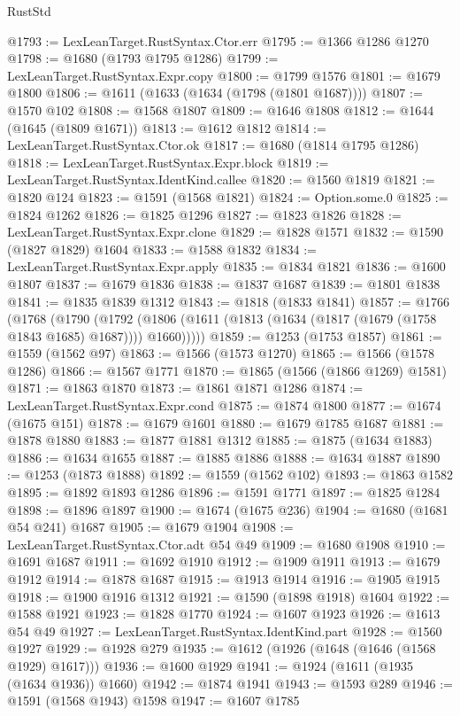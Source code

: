 \begin{lexlean}{RustStd}
\begin{coremodule}
@1793 := LexLeanTarget.RustSyntax.Ctor.err
@1795 := @1366 @1286 @1270
@1798 := @1680 (@1793 @1795 @1286)
@1799 := LexLeanTarget.RustSyntax.Expr.copy
@1800 := @1799 @1576
@1801 := @1679 @1800
@1806 := @1611 (@1633 (@1634 (@1798 (@1801 @1687))))
@1807 := @1570 @102
@1808 := @1568 @1807
@1809 := @1646 @1808
@1812 := @1644 (@1645 (@1809 @1671))
@1813 := @1612 @1812
@1814 := LexLeanTarget.RustSyntax.Ctor.ok
@1817 := @1680 (@1814 @1795 @1286)
@1818 := LexLeanTarget.RustSyntax.Expr.block
@1819 := LexLeanTarget.RustSyntax.IdentKind.callee
@1820 := @1560 @1819
@1821 := @1820 @124
@1823 := @1591 (@1568 @1821)
@1824 := Option.some.{0}
@1825 := @1824 @1262
@1826 := @1825 @1296
@1827 := @1823 @1826
@1828 := LexLeanTarget.RustSyntax.Expr.clone
@1829 := @1828 @1571
@1832 := @1590 (@1827 @1829) @1604
@1833 := @1588 @1832
@1834 := LexLeanTarget.RustSyntax.Expr.apply
@1835 := @1834 @1821
@1836 := @1600 @1807
@1837 := @1679 @1836
@1838 := @1837 @1687
@1839 := @1801 @1838
@1841 := @1835 @1839 @1312
@1843 := @1818 (@1833 @1841)
@1857 := @1766
    (@1768
      (@1790
        (@1792 (@1806 (@1611 (@1813 (@1634 (@1817 (@1679 (@1758 @1843 @1685) @1687)))) @1660)))))
@1859 := @1253 (@1753 @1857)
@1861 := @1559 (@1562 @97)
@1863 := @1566 (@1573 @1270)
@1865 := @1566 (@1578 @1286)
@1866 := @1567 @1771
@1870 := @1865 (@1566 (@1866 @1269) @1581)
@1871 := @1863 @1870
@1873 := @1861 @1871 @1286
@1874 := LexLeanTarget.RustSyntax.Expr.cond
@1875 := @1874 @1800
@1877 := @1674 (@1675 @151)
@1878 := @1679 @1601
@1880 := @1679 @1785 @1687
@1881 := @1878 @1880
@1883 := @1877 @1881 @1312
@1885 := @1875 (@1634 @1883)
@1886 := @1634 @1655
@1887 := @1885 @1886
@1888 := @1634 @1887
@1890 := @1253 (@1873 @1888)
@1892 := @1559 (@1562 @102)
@1893 := @1863 @1582
@1895 := @1892 @1893 @1286
@1896 := @1591 @1771
@1897 := @1825 @1284
@1898 := @1896 @1897
@1900 := @1674 (@1675 @236)
@1904 := @1680 (@1681 @54 @241) @1687
@1905 := @1679 @1904
@1908 := LexLeanTarget.RustSyntax.Ctor.adt @54 @49
@1909 := @1680 @1908
@1910 := @1691 @1687
@1911 := @1692 @1910
@1912 := @1909 @1911
@1913 := @1679 @1912
@1914 := @1878 @1687
@1915 := @1913 @1914
@1916 := @1905 @1915
@1918 := @1900 @1916 @1312
@1921 := @1590 (@1898 @1918) @1604
@1922 := @1588 @1921
@1923 := @1828 @1770
@1924 := @1607 @1923
@1926 := @1613 @54 @49
@1927 := LexLeanTarget.RustSyntax.IdentKind.part
@1928 := @1560 @1927
@1929 := @1928 @279
@1935 := @1612 (@1926 (@1648 (@1646 (@1568 @1929) @1617)))
@1936 := @1600 @1929
@1941 := @1924 (@1611 (@1935 (@1634 @1936)) @1660)
@1942 := @1874 @1941
@1943 := @1593 @289
@1946 := @1591 (@1568 @1943) @1598
@1947 := @1607 @1785

\end{coremodule}
\end{lexlean}

